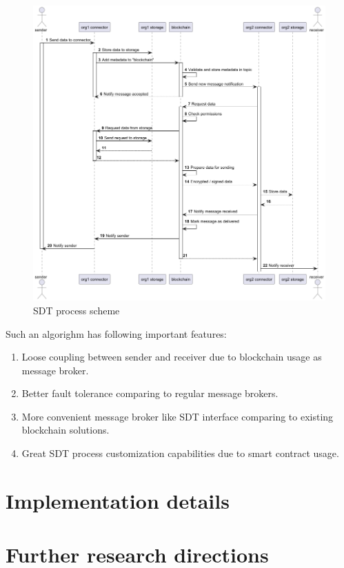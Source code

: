 \documentclass[10pt]{llncs}
\begin{document}
\begin{figure}
    \includegraphics[width=\textwidth]{sending_process.png}
    \caption{SDT process scheme} \label{sending_process}
\end{figure}

Such an algorighm has following important features:

\begin{enumerate}
    \item Loose coupling between sender and receiver due to blockchain usage as message broker.
    \item Better fault tolerance comparing to regular message brokers.
    \item More convenient message broker like SDT interface comparing to existing blockchain solutions.
    \item Great SDT process customization capabilities due to smart contract usage.
\end{enumerate}


\section{Implementation details} \label{implementation_details}

\section{Further research directions} \label{further_research_directions}



\end{document}
